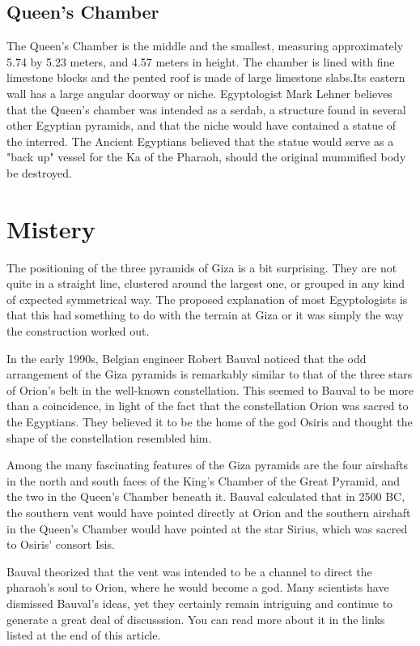 \documentclass[12 pt]{article}
\begin{document}
\subsection{Queen's Chamber}

The Queen's Chamber is the middle and the smallest, measuring approximately 5.74 by 5.23 meters, and 4.57 meters in height. The chamber is lined with fine limestone blocks and the pented roof is made of large limestone slabs.Its eastern wall has a large angular doorway or niche. Egyptologist Mark Lehner believes that the Queen's chamber was intended as a serdab, a structure found in several other Egyptian pyramids, and that the niche would have contained a statue of the interred. The Ancient Egyptians believed that the statue would serve as a "back up" vessel for the Ka of the Pharaoh, should the original mummified body be destroyed. 

\section{Mistery}
The positioning of the three pyramids of Giza is a bit surprising. They are not quite in a straight line, clustered around the largest one, or grouped in any kind of expected symmetrical way. The proposed explanation of most Egyptologists is that this had something to do with the terrain at Giza or it was simply the way the construction worked out.

In the early 1990s, Belgian engineer Robert Bauval noticed that the odd arrangement of the Giza pyramids is remarkably similar to that of the three stars of Orion's belt in the well-known constellation. This seemed to Bauval to be more than a coincidence, in light of the fact that the constellation Orion was sacred to the Egyptians. They believed it to be the home of the god Osiris and thought the shape of the constellation resembled him.

Among the many fascinating features of the Giza pyramids are the four airshafts in the north and south faces of the King's Chamber of the Great Pyramid, and the two in the Queen's Chamber beneath it. Bauval calculated that in 2500 BC, the southern vent would have pointed directly at Orion and the southern airshaft in the Queen's Chamber would have pointed at the star Sirius, which was sacred to Osiris' consort Isis.


Bauval theorized that the vent was intended to be a channel to direct the pharaoh's soul to Orion, where he would become a god. Many scientists have dismissed Bauval's ideas, yet they certainly remain intriguing and continue to generate a great deal of discusssion. You can read more about it in the links listed at the end of this article.
\end{document}
